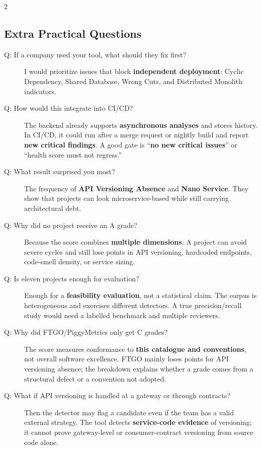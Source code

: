 \documentclass[10pt,a4paper]{article}
\begin{document}
\begin{multicols}{2}
\subsection{Extra Practical Questions}

\begin{description}
    \item[Q: If a company used your tool, what should they fix first?]
    I would prioritize issues that block \textbf{independent deployment}: Cyclic Dependency, Shared Database, Wrong Cuts, and Distributed Monolith indicators.

    \item[Q: How would this integrate into CI/CD?]
    The backend already supports \textbf{asynchronous analyses} and stores history. In CI/CD, it could run after a merge request or nightly build and report \textbf{new critical findings}. A good gate is ``\textbf{no new critical issues}'' or ``health score must not regress.''

    \item[Q: What result surprised you most?]
    The frequency of \textbf{API Versioning Absence} and \textbf{Nano Service}. They show that projects can look microservice-based while still carrying architectural debt.

    \item[Q: Why did no project receive an A grade?]
    Because the score combines \textbf{multiple dimensions}. A project can avoid severe cycles and still lose points in API versioning, hardcoded endpoints, code-smell density, or service sizing.

    \item[Q: Is eleven projects enough for evaluation?]
    Enough for a \textbf{feasibility evaluation}, not a statistical claim. The corpus is heterogeneous and exercises different detectors. A true precision/recall study would need a labelled benchmark and multiple reviewers.

    \item[Q: Why did FTGO/PiggyMetrics only get C grades?]
    The score measures conformance to \textbf{this catalogue and conventions}, not overall software excellence. FTGO mainly loses points for API versioning absence; the breakdown explains whether a grade comes from a structural defect or a convention not adopted.

    \item[Q: What if API versioning is handled at a gateway or through contracts?]
    Then the detector may flag a candidate even if the team has a valid external strategy. The tool detects \textbf{service-code evidence} of versioning; it cannot prove gateway-level or consumer-contract versioning from source code alone.


\end{description}
\end{multicols}
\end{document}
